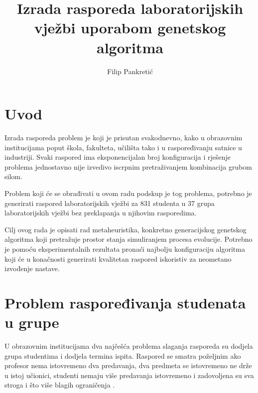 \documentclass[times, utf8, zavrsni]{fer}
\begin{document}

\title{Izrada rasporeda laboratorijskih vježbi uporabom genetskog algoritma}

\author{Filip Pankretić}

\maketitle

\izvornik


\tableofcontents
\listoffigures

\chapter{Uvod}

Izrada rasporeda problem je koji je prisutan svakodnevno, kako u obrazovnim institucijama poput škola, fakulteta, učilišta tako i u raspoređivanju satnice u industriji. Svaki raspored ima eksponencijalan broj konfiguracija i rješenje problema jednostavno nije izvedivo iscrpnim pretraživanjem kombinacija grubom silom.

Problem koji će se obrađivati u ovom radu podskup je tog problema, potrebno je generirati raspored laboratorijskih vježbi za 831 studenta u 37 grupa laboratorijskih vježbi bez preklapanja u njihovim rasporedima.

Cilj ovog rada je opisati rad metaheuristika, konkretno generacijskog genetskog algoritma koji pretražuje prostor stanja simuliranjem procesa evolucije. Potrebno je pomoću eksperimentalnih rezultata pronaći najbolju konfiguraciju algoritma koji će u konačnosti generirati kvalitetan raspored iskoristiv za neometano izvođenje nastave.

\chapter{Problem raspoređivanja studenata u grupe}

U obrazovnim institucijama dva najčešća problema slaganja rasporeda su dodjela grupa studentima i dodjela termina ispita. Raspored se smatra poželjnim ako profesor nema istovremeno dva predavanja, dva predmeta se istovremeno ne drže u istoj učionici, studenti nemaju više predavanja istovremeno i zadovoljena su sva stroga i što više blagih ograničenja \citep{ganguli2017study}.
\end{document}
